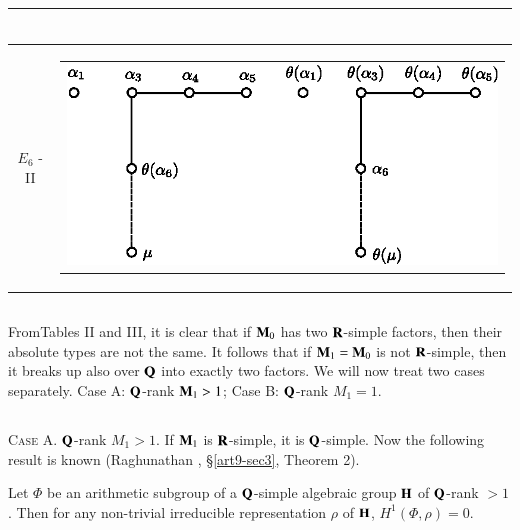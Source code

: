 {\begin{longtable}{@{}|c|c|@{}}
\begin{tabular}{c}
\end{tabular}\\\hline
$E_6$ - II &
\begin{tabular}{c}
{\includegraphics[scale=0.8]{307e.eps}}
\end{tabular}\\\hline
\end{longtable}
}\relax

\subsection{}\label{art9-subsec5.21}
From\pageoriginale Tables II and III, it is clear that if $\mathbf{M}_0$ has two $\mathbf{R}$-simple factors, then their absolute types are not the same. It follows that if $\mathbf{M}_1 = \mathbf{M}_0$ is not $\mathbf{R}$-simple, then it breaks up also over $\mathbf{Q}$ into exactly two factors. We will now treat two cases separately. Case A: $\mathbf{Q}$-rank $\mathbf{M}_1 > 1$; Case B: $\mathbf{Q}$-rank $M_1 = 1$.

\subsection{}\label{art9-subsec5.22}
\textsc{Case A.} $\mathbf{Q}$-rank $M_1 > 1$. If $\mathbf{M}_1$ is $\mathbf{R}$-simple, it is $\mathbf{Q}$-simple. Now the following result is known (Raghunathan \cite{art9-raghunathan-2}, \S \ref{art9-sec3}, Theorem 2).

Let $\Phi$ be an arithmetic subgroup of a $\mathbf{Q}$-simple algebraic group $\mathbf{H}$ of $\mathbf{Q}$-rank $>1$. Then for any non-trivial irreducible representation $\rho$ of $\mathbf{H}$, $H^1 (\Phi, \rho) =0$.

